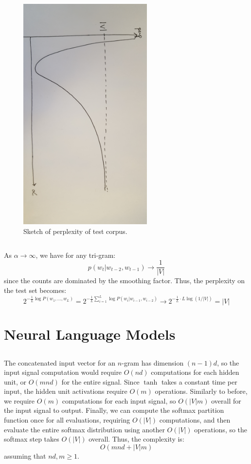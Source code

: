 \documentclass[psamsfonts]{amsart}
\theoremstyle{definition}
\theoremstyle{remark}
\numberwithin{equation}{section}
\begin{document}
\begin{figure}
	\includegraphics[width=0.6\textwidth]{1-3.jpg}
	\caption{Sketch of perplexity of test corpus.}
\end{figure}

\subsection{} As $\alpha \rightarrow \infty$, we have for any tri-gram:
$$p(w_t|w_{t-2},w_{t-1}) \rightarrow \frac{1}{|V|}$$
since the counts are dominated by the smoothing factor. Thus, the perplexity on the test set becomes:
$$2^{-\frac{1}{L}\log P(w_1, \dots, w_L)} = 2^{-\frac{1}{L}\sum_{i=1}^L \log P(w_i|w_{i-1},w_{i-2})} \rightarrow 2^{-\frac{1}{L}\cdot L \log(1/|V|)} = |V|$$

\section{Neural Language Models}

\subsection{} The concatenated input vector for an $n$-gram has dimension $(n-1)d$, so the input signal computation would require $O(nd)$ computations for each hidden unit, or $O(mnd)$ for the entire signal. Since $\tanh$ takes a constant time per input, the hidden unit activations require $O(m)$ operations. Similarly to before, we require $O(m)$ computations for each input signal, so $O(|V|m)$ overall for the input signal to output. Finally, we can compute the softmax partition function once for all evaluations, requiring $O(|V|)$ computations, and then evaluate the entire softmax distribution using another $O(|V|)$ operations, so the softmax step takes $O(|V|)$ overall. Thus, the complexity is:
$$O(mnd + |V|m)$$
assuming that $nd, m \geq 1$.
\end{document}
